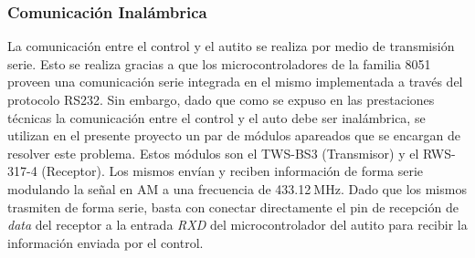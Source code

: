 \documentclass[a4paper,10pt]{article}
\begin{document}
				\subsubsection{Comunicación Inalámbrica}	
			 		La comunicación entre el control y el autito se realiza por medio de transmisión serie. Esto se realiza gracias a que los microcontroladores de
					la familia 8051 proveen una comunicación serie integrada en el mismo implementada a través del protocolo RS232. Sin embargo, dado que como se 
					expuso en las prestaciones técnicas la comunicación entre el control y el auto debe ser inalámbrica, se utilizan en el presente proyecto un par
					de módulos apareados que se encargan de resolver este problema. Estos módulos son el TWS-BS3 (Transmisor) y el RWS-317-4 (Receptor). Los
					mismos envían y reciben información de forma serie modulando la señal en AM a una frecuencia de 433.12$~\text{MHz}$. Dado que los mismos trasmiten
					de forma serie, basta con conectar directamente el pin de recepción de \emph{data} del receptor a la entrada \emph{RXD} del microcontrolador del 
					autito para recibir la información enviada por el control. 
				
\end{document}
